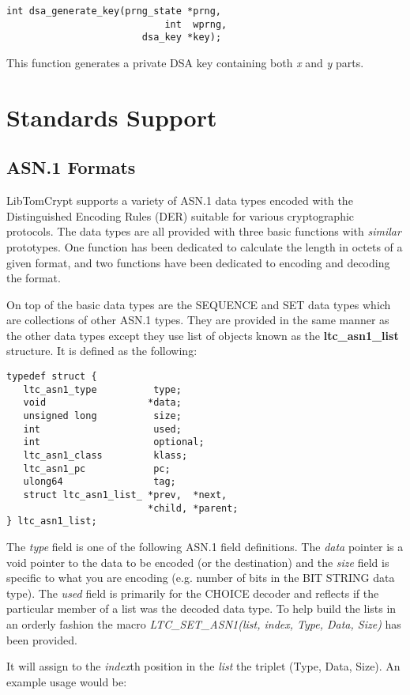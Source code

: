 \documentclass[synpaper]{book}
\newcommand{\mysection}[1]    %
	{                   %
	\section{#1}
   \markboth{\textsf{www.libtom.net}}{\thesection ~ {#1}}
	}
\begin{document}
\begin{verbatim}
int dsa_generate_key(prng_state *prng,
                            int  wprng,
                        dsa_key *key);
\end{verbatim}

This function generates a private DSA key containing both \textit{x} and \textit{y} parts.

\chapter{Standards Support}
\mysection{ASN.1 Formats}
LibTomCrypt supports a variety of ASN.1 data types encoded with the Distinguished Encoding Rules (DER) suitable for various cryptographic protocols.  The data types
are all provided with three basic functions with \textit{similar} prototypes.  One function has been dedicated to calculate the length in octets of a given
format, and two functions have been dedicated to encoding and decoding the format.

On top of the basic data types are the SEQUENCE and SET data types which are collections of other ASN.1 types.  They are provided
in the same manner as the other data types except they use list of objects known as the \textbf{ltc\_asn1\_list} structure.  It is defined as the following:

\begin{verbatim}
typedef struct {
   ltc_asn1_type          type;
   void                  *data;
   unsigned long          size;
   int                    used;
   int                    optional;
   ltc_asn1_class         klass;
   ltc_asn1_pc            pc;
   ulong64                tag;
   struct ltc_asn1_list_ *prev,  *next,
                         *child, *parent;
} ltc_asn1_list;
\end{verbatim}

The \textit{type} field is one of the following ASN.1 field definitions.  The \textit{data} pointer is a void pointer to the data to be encoded (or the destination) and the
\textit{size} field is specific to what you are encoding (e.g. number of bits in the BIT STRING data type).  The \textit{used} field is primarily for the CHOICE decoder
and reflects if the particular member of a list was the decoded data type.  To help build the lists in an orderly fashion the macro
\textit{LTC\_SET\_ASN1(list, index, Type, Data, Size)} has been provided.

It will assign to the \textit{index}th position in the \textit{list} the triplet (Type, Data, Size).  An example usage would be:
\end{document}
